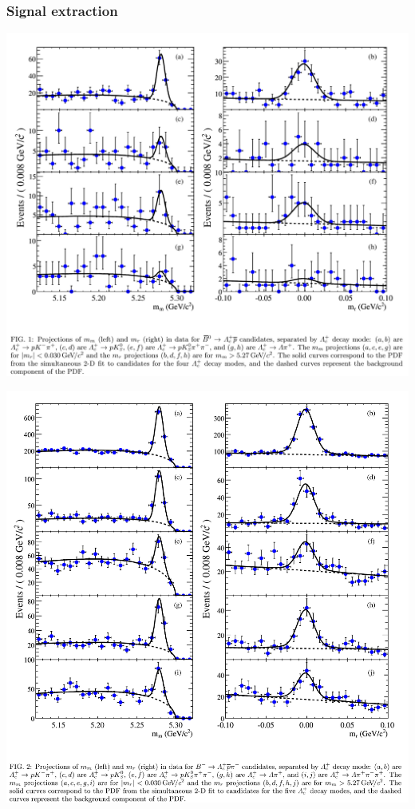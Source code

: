 \documentclass[10pt, aspectratio=169]{beamer}
\begin{document}
\begin{frame}[label=fit]%
  \frametitle{Signal extraction}





  \parbox{.48\textwidth}{
    \includegraphics[width=\linewidth]{figures/002/fits-Lcp}
  } \parbox{.48\textwidth}{
    \includegraphics[width=\linewidth]{figures/002/fits-Lcppi}
}
\end{frame}
\end{document}

